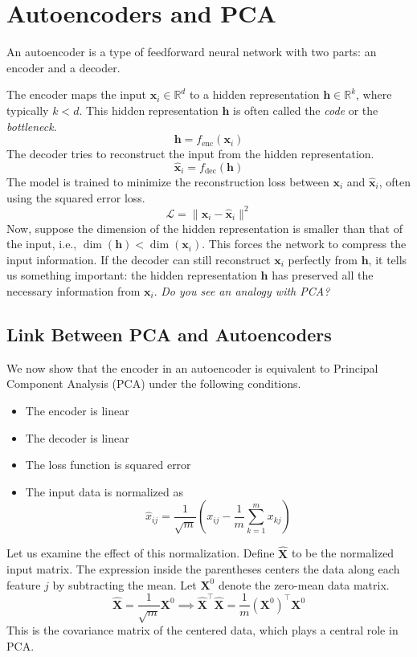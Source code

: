 \section{Autoencoders and PCA}

An autoencoder is a type of feedforward neural network with two parts: an encoder and a decoder.

The encoder maps the input \( \mathbf{x}_i \in \mathbb{R}^d \) to a hidden representation \( \mathbf{h} \in \mathbb{R}^k \), where typically \( k < d \). This hidden representation \( \mathbf{h} \) is often called the \textit{code} or the \textit{bottleneck}.
\[
\mathbf{h} = f_{\text{enc}}(\mathbf{x}_i)
\]
The decoder tries to reconstruct the input from the hidden representation.
\[
\hat{\mathbf{x}}_i = f_{\text{dec}}(\mathbf{h})
\]
The model is trained to minimize the reconstruction loss between \( \mathbf{x}_i \) and \( \hat{\mathbf{x}}_i \), often using the squared error loss.
\[
\mathcal{L} = \| \mathbf{x}_i - \hat{\mathbf{x}}_i \|^2
\]
Now, suppose the dimension of the hidden representation is smaller than that of the input, i.e., \( \dim(\mathbf{h}) < \dim(\mathbf{x}_i) \). This forces the network to compress the input information. If the decoder can still reconstruct \( \mathbf{x}_i \) perfectly from \( \mathbf{h} \), it tells us something important: the hidden representation \( \mathbf{h} \) has preserved all the necessary information from \( \mathbf{x}_i \). \textit{Do you see an analogy with PCA?}

\subsection{Link Between PCA and Autoencoders}

We now show that the encoder in an autoencoder is equivalent to Principal Component Analysis (PCA) under the following conditions.
\begin{itemize}
    \item The encoder is linear
    \item The decoder is linear
    \item The loss function is squared error
    \item The input data is normalized as
    \[
    \hat{x}_{ij} = \frac{1}{\sqrt{m}} \left( x_{ij} - \frac{1}{m} \sum_{k=1}^{m} x_{kj} \right)
    \]
\end{itemize}

Let us examine the effect of this normalization. Define \( \hat{\mathbf{X}} \) to be the normalized input matrix. The expression inside the parentheses centers the data along each feature \( j \) by subtracting the mean. Let \( \mathbf{X}^0 \) denote the zero-mean data matrix. 
\[
\hat{\mathbf{X}} = \frac{1}{\sqrt{m}} \mathbf{X}^0 \implies \hat{\mathbf{X}}^\top \hat{\mathbf{X}} = \frac{1}{m} (\mathbf{X}^0)^\top \mathbf{X}^0
\]
This is the covariance matrix of the centered data, which plays a central role in PCA.

